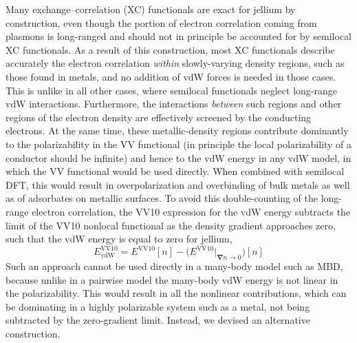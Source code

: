 Many exchange--correlation (XC) functionals are exact for jellium by construction, even though the portion of electron correlation coming from plasmons is long-ranged and should not in principle be accounted for by semilocal XC functionals.
As a result of this construction, most XC functionals describe accurately the electron correlation \emph{within} slowly-varying density regions, such as those found in metals, and no addition of vdW forces is needed in those cases.
This is unlike in all other cases, where semilocal functionals neglect long-range vdW interactions.
Furthermore, the interactions \emph{between} such regions and other regions of the electron density are effectively screened by the conducting electrons.
At the same time, these metallic-density regions contribute dominantly to the polarizability in the VV functional (in principle the local polarizability of a conductor should be infinite) and hence to the vdW energy in any vdW model, in which the VV functional would be used directly.
When combined with semilocal DFT, this would result in overpolarization and overbinding of bulk metals as well as of adsorbates on metallic surfaces.
To avoid this double-counting of the long-range electron correlation, the VV10 expression for the vdW energy subtracts the limit of the VV10 nonlocal functional as the density gradient approaches zero, such that the vdW energy is equal to zero for jellium,
\begin{equation}
  E_\text{vdW}^\text{VV10} = E^\text{VV10}[n]-\bigl(E^\text{VV10}|_{\boldsymbol\nabla n\rightarrow0}\bigr)[n]
\end{equation}
Such an approach cannot be used directly in a many-body model such as MBD, because unlike in a pairwise model the many-body vdW energy is not linear in the polarizability.
This would result in all the nonlinear contributions, which can be dominating in a highly polarizable system such as a metal, not being subtracted by the zero-gradient limit.
Instead, we devised an alternative construction.

